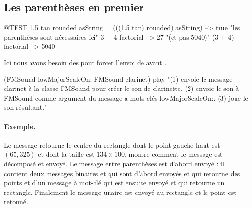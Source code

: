 \documentclass[a4paper,10pt,twoside]{book}
\begin{document}
\subsection{Les parenth\`eses en premier}


\begin{code}{@TEST}
1.5 tan rounded asString = (((1.5 tan) rounded) asString) --> true    "les parenth\`eses sont n\'ecessaires ici"
3 + 4 factorial   --> 27    "(et pas 5040)"
(3 + 4) factorial --> 5040
\end{code}

Ici nous avons besoin des  pour forcer l'envoi de  avant .
\begin{code}{}
(FMSound lowMajorScaleOn: FMSound clarinet) play 
"(1) envoie le message clarinet \`a la classe FMSound pour cr\'eer le son de clarinette.
 (2) envoie le son \`a FMSound comme argument du message \`a mots-cl\'es lowMajorScaleOn:.
 (3) joue le son r\'esultant."
\end{code}



\paragraph{Exemple.}
Le message  retourne le centre du rectangle dont le point gauche haut est $(65, 325)$ et dont la taille est $134{\times}100$.  montre comment le message est d\'ecompos\'e et envoy\'e. Le message entre parenth\`eses est d'abord envoy\'e : il contient deux messages binaires  et  qui sont d'abord envoy\'es et qui retourne des points et d'un message \`a mot-cl\'e  qui est ensuite envoy\'e et qui retourne un rectangle. Finalement le message unaire  est envoy\'e au rectangle et le point est retoun\'e.
\end{document}
